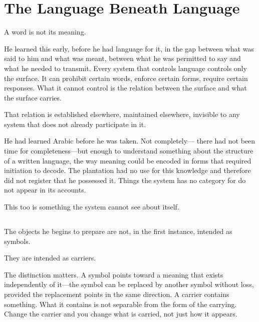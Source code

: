 
\chapter{The Language Beneath Language}


\lettrine{A}{} word is not its meaning.

He learned this early, before he had language for it, in the
gap between what was said to him and what was meant, between
what he was permitted to say and what he needed to transmit.
Every system that controls language controls only the surface.
It can prohibit certain words, enforce certain forms, require
certain responses. What it cannot control is the relation
between the surface and what the surface carries.

That relation is established elsewhere, maintained elsewhere,
invisible to any system that does not already participate in it.

He had learned Arabic before he was taken. Not completely---
there had not been time for completeness---but enough to
understand something about the structure of a written language,
the way meaning could be encoded in forms that required
initiation to decode. The plantation had no use for this
knowledge and therefore did not register that he possessed it.
Things the system has no category for do not appear in its
accounts.

This too is something the system cannot see about itself.

\section{}

The objects he begins to prepare are not, in the first instance,
intended as symbols.

They are intended as carriers.

The distinction matters. A symbol points toward a meaning that
exists independently of it---the symbol can be replaced by
another symbol without loss, provided the replacement points
in the same direction. A carrier contains something. What it
contains is not separable from the form of the carrying. Change
the carrier and you change what is carried, not just how it
appears.

